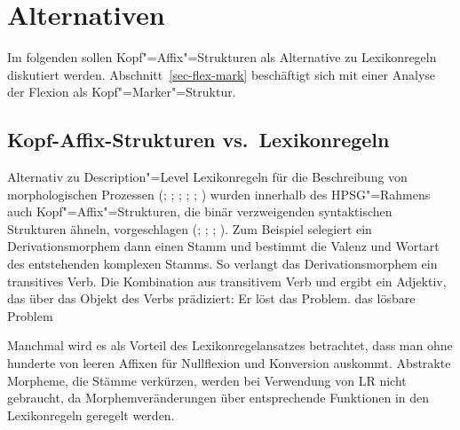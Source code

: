 \section{Alternativen}

Im folgenden sollen Kopf"=Affix"=Strukturen als Alternative zu Lexikonregeln diskutiert werden.
Abschnitt~\ref{sec-flex-mark} beschäftigt sich mit einer Analyse der Flexion als Kopf"=Marker"=Struktur.

\subsection{Kopf-Affix-Strukturen vs.\ Lexikonregeln}
\label{morphem-vs-lr}

Alternativ zu Description"=Level Lexikonregeln für die Beschreibung von morphologischen Prozessen
(\citealp{Orgun96a}; \citealp{Riehemann98a}; \citealp{AW98a}; \citealp{Koenig99a};
\citealp[Kapitel~6.2.5]{Mueller2002b}; \citealp{Crysmann2002a}) wurden innerhalb des HPSG"=Rahmens
auch Kopf"=Affix"=Strukturen, die binär verzweigenden syntaktischen Strukturen ähneln, vorgeschlagen 
(\citealp{KN93a}; \citealp{Krieger94a}; \citealp{Eynde94}; \citealp{Lebeth94}).
Zum Beispiel selegiert ein Derivationsmorphem dann einen Stamm und bestimmt die Valenz und Wortart
des entstehenden komplexen Stamms. So verlangt das Derivationsmorphem  ein transitives
Verb. Die Kombination aus transitivem Verb und  ergibt ein Adjektiv, das über
das Objekt des Verbs prädiziert:
\eal
\ex Er löst das Problem.
\ex das lösbare Problem
\zl


\noindent
Manchmal wird es als Vorteil des Lexikonregelansatzes betrachtet, dass man ohne hunderte von leeren
Affixen für Nullflexion und Konversion auskommt. Abstrakte Morpheme, die Stämme verkürzen, werden bei Verwendung
von LR nicht gebraucht, da Morphemveränderungen über entsprechende Funktionen in den Lexikonregeln
geregelt werden. 

